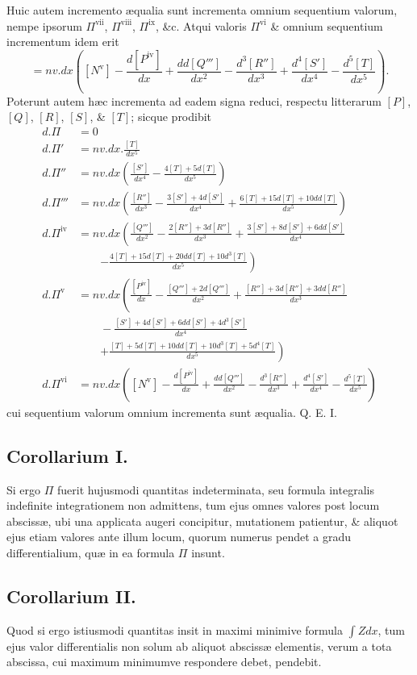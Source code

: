 Huic autem incremento æqualia sunt incrementa omnium sequentium valorum, nempe ipsorum $\Pi^{\mathrm{vii}}$, $\Pi^{\mathrm{viii}}$, $\Pi^{\mathrm{ix}}$, \&c. Atqui valoris $\Pi^{\mathrm{vi}}$ \& omnium sequentium incrementum idem erit
\[=nv.dx\left([N^{\mathrm{v}}]-\frac{d[P^{\mathrm{iv}}]}{dx}+\frac{dd[Q''']}{dx^2}-\frac{d^3[R'']}{dx^3}+\frac{d^4[S']}{dx^4}-\frac{d^5[T]}{dx^5}\right).\]
Poterunt autem hæc incrementa ad eadem signa reduci, respectu litterarum $[P]$, $[Q]$, $[R]$, $[S]$, \& $[T]$; sicque prodibit
\[\begin{aligned}
d.\Pi&=0\\
d.\Pi'&=nv.dx.\frac{[T]}{dx^5}\\
d.\Pi''&=nv.dx\left(\frac{[S']}{dx^4}-\frac{4[T]+5d[T]}{dx^5}\right)\\
d.\Pi'''&=nv.dx\left(\frac{[R'']}{dx^3}-\frac{3[S']+4d[S']}{dx^4}+\frac{6[T]+15d[T]+10dd[T]}{dx^5}\right)\\
d.\Pi^{\mathrm{iv}}&=nv.dx\left(\frac{[Q''']}{dx^2}-\frac{2[R'']+3d[R'']}{dx^3}+\frac{3[S']+8d[S']+6dd[S']}{dx^4}\right.\\&\qquad\left.-\frac{4[T]+15d[T]+20dd[T]+10d^3[T]}{dx^5}\right)\\
d.\Pi^{\mathrm{v}}&=nv.dx\left(\frac{[P^{\mathrm{iv}}]}{dx}-\frac{[Q''']+2d[Q''']}{dx^2}+\frac{[R'']+3d[R'']+3dd[R'']}{dx^3}\right.\\&\qquad-\frac{[S']+4d[S']+6dd[S']+4d^3[S']}{dx^4}\\&\qquad\left.+\frac{[T]+5d[T]+10dd[T]+10d^3[T]+5d^4[T]}{dx^5}\right)\\
d.\Pi^{\mathrm{vi}}&=nv.dx\left([N^{\mathrm{v}}]-\frac{d[P^{\mathrm{iv}}]}{dx}+\frac{dd[Q''']}{dx^2}-\frac{d^3[R'']}{dx^3}+\frac{d^4[S']}{dx^4}-\frac{d^5[T]}{dx^5}\right)
\end{aligned}\]
cui sequentium valorum omnium incrementa sunt æqualia. Q. E. I.
\subsection*{Corollarium I.}
Si ergo $\Pi$ fuerit hujusmodi quantitas indeterminata, seu formula integralis indefinite integrationem non admittens, tum ejus omnes valores post locum abscissæ, ubi una applicata augeri concipitur, mutationem patientur, \& aliquot ejus etiam valores ante illum locum, quorum numerus pendet a gradu differentialium, quæ in ea formula $\Pi$ insunt.
\subsection*{Corollarium II.}
Quod si ergo istiusmodi quantitas insit in maximi minimive formula $\int Zdx$, tum ejus valor differentialis non solum ab aliquot abscissæ elementis, verum a tota abscissa, cui maximum minimumve respondere debet, pendebit.
